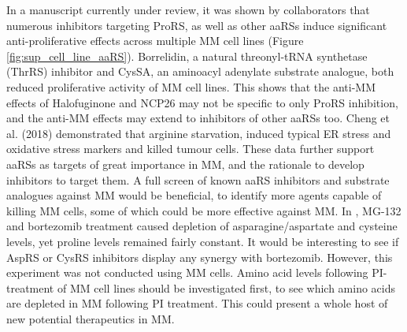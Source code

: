 \noindent
In a manuscript currently under review, it was shown by collaborators that numerous inhibitors targeting ProRS, as well as other aaRSs induce significant anti-proliferative effects across multiple MM cell lines (Figure \ref{fig:sup_cell_line_aaRS})\cite{bottpreclinical2022}.
Borrelidin, a natural threonyl-tRNA synthetase (ThrRS) inhibitor and CysSA, an aminoacyl adenylate substrate analogue, both reduced proliferative activity of MM cell lines.
This shows that the anti-MM effects of Halofuginone and NCP26 may not be specific to only ProRS inhibition, and the anti-MM effects may extend to inhibitors of other aaRSs too.
Cheng et al. (2018) demonstrated that arginine starvation, induced typical ER stress and oxidative stress markers and killed tumour cells\cite{cheng2018arginine}.
These data further support aaRSs as targets of great importance in MM, and the rationale to develop inhibitors to target them.
A full screen of known aaRS inhibitors and substrate analogues against MM would be beneficial, to identify more agents capable of killing MM cells, some of which could be more effective against MM\@.
In \cite{suraweera2012failure}, MG-132 and bortezomib treatment caused depletion of asparagine/aspartate and cysteine levels, yet proline levels remained fairly constant.
It would be interesting to see if AspRS or CysRS inhibitors display any synergy with bortezomib.
However, this experiment was not conducted using MM cells.
Amino acid levels following PI-treatment of MM cell lines should be investigated first, to see which amino acids are depleted in MM following PI treatment.
This could present a whole host of new potential therapeutics in MM\@.







